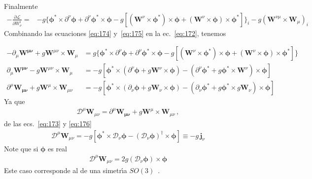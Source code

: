 Finalmente
\begin{align}
  \label{eq:174}
  -\frac{\partial\mathcal{L}}{\partial W^i_\nu}=&-g\{\boldsymbol{\phi}^*\times\partial^\nu\boldsymbol{\phi}+\partial^\nu\boldsymbol{\phi}^*\times\boldsymbol{\phi}
  -g[(\mathbf{W}^\nu\times\boldsymbol{\phi}^*)\times\boldsymbol{\phi}+(\mathbf{W}^\nu\times\boldsymbol{\phi})\times\boldsymbol{\phi}^*]\}_i 
  -g(\mathbf{W}^{\nu\mu}\times\mathbf{W}_\mu)_i
\end{align}
Combinando las ecuaciones \eqref{eq:174} y~\eqref{eq:175} en la ec.~\eqref{eq:172}, tenemos


\begin{align}
-\partial_\mu\mathbf{W^{\mu\nu}}+g\mathbf{W}^{\mu\nu}\times\mathbf{W}_\mu&=g\{\boldsymbol{\phi}^*\times\partial^\nu\boldsymbol{\phi}+\partial^\nu\boldsymbol{\phi}^*\times\boldsymbol{\phi}
-g[(\mathbf{W}^\nu\times\boldsymbol{\phi}^*)\times\boldsymbol{\phi}+(\mathbf{W}^\nu\times\boldsymbol{\phi})\times\boldsymbol{\phi}^*]\} \nonumber\\
\partial_\mu\mathbf{W^{\mu\nu}}-g\mathbf{W}^{\mu\nu}\times\mathbf{W}_\mu&=-g[\boldsymbol{\phi}^*\times(\partial^\nu\boldsymbol{\phi}+g\mathbf{W}^\nu\times\boldsymbol{\phi})-(\partial^\nu\boldsymbol{\phi}^*+g\boldsymbol{\phi}^*\times\mathbf{W}^\nu)\times\boldsymbol{\phi}] \nonumber\\
\partial^\mu\mathbf{W_{\mu\nu}}+g\mathbf{W}^\mu\times\mathbf{W}_{\mu\nu}&=-g[\boldsymbol{\phi}^*\times(\partial_\nu\boldsymbol{\phi}+g\mathbf{W}_\nu\times\boldsymbol{\phi})-(\partial_\nu\boldsymbol{\phi}^*+g\boldsymbol{\phi}^*\times g\mathbf{W}_\nu)\times\boldsymbol{\phi}] 
\end{align}
Ya que
\begin{align}
\label{eq:257}
  \mathcal{D}^\mu\mathbf{W}_{\mu\nu}=\partial^\mu\mathbf{W_{\mu\nu}}+g\mathbf{W}^\mu\times\mathbf{W}_{\mu\nu}\,,
\end{align}
de las ecs.~\eqref{eq:173} y \eqref{eq:176}
\begin{align}
  \label{eq:181}
  \mathcal{D}^\mu\mathbf{W}_{\mu\nu}=-g[
\boldsymbol{\phi}^*\times\mathcal{D}_\nu\boldsymbol{\phi}
-(\mathcal{D}_\nu\boldsymbol{\phi})^\dagger\times\boldsymbol{\phi} ]\equiv-g\,\mathbf{j}_\nu
\end{align}
Note que si $\mathbf{\phi}$ es real 
\begin{align}
  \mathcal{D}^\mu\mathbf{W}_{\mu\nu}=2 g
(\mathcal{D}_\nu\boldsymbol{\phi})\times\boldsymbol{\phi} 
\end{align}
Este caso corresponde al de una simetr\'\i a $SO(3)$~\cite{Ryder:1985wq}. 

